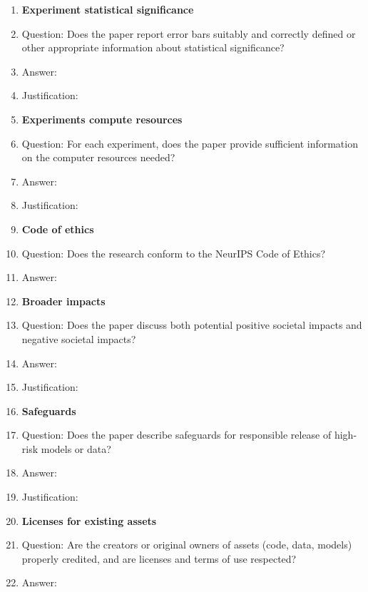 \begin{enumerate}
\item {\bf Experiment statistical significance}
\item[] Question: Does the paper report error bars suitably and correctly defined or other appropriate information about statistical significance?
\item[] Answer: \todo{[Yes]}
\item[] Justification: 

\item {\bf Experiments compute resources}
\item[] Question: For each experiment, does the paper provide sufficient information on the computer resources needed?
\item[] Answer: \todo{[Yes]}
\item[] Justification: 

\item {\bf Code of ethics}
\item[] Question: Does the research conform to the NeurIPS Code of Ethics?
\item[] Answer: \todo{[Yes]}

\item {\bf Broader impacts}
\item[] Question: Does the paper discuss both potential positive societal impacts and negative societal impacts?
\item[] Answer: \todo{[Yes]}
\item[] Justification: 

\item {\bf Safeguards}
\item[] Question: Does the paper describe safeguards for responsible release of high-risk models or data?
\item[] Answer: \todo{[Yes/NA]}
\item[] Justification: 

\item {\bf Licenses for existing assets}
\item[] Question: Are the creators or original owners of assets (code, data, models) properly credited, and are licenses and terms of use respected?
\item[] Answer: \todo{[Yes]}


\end{enumerate}
